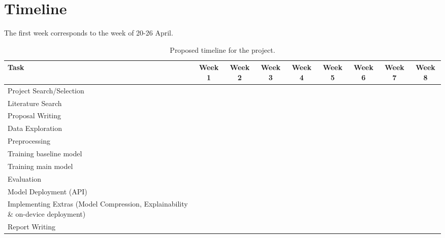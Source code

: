 \section{Timeline}

The first week corresponds to the week of 20-26 April.

\begin{table}[H]
\centering
\small
\setlength{\tabcolsep}{3pt}
\begin{tabular}{|p{2.5cm}|c|c|c|c|c|c|c|c|}
    \hline
    \textbf{Task} & \textbf{Week 1} & \textbf{Week 2} & \textbf{Week 3} & \textbf{Week 4} & \textbf{Week 5} & \textbf{Week 6} & \textbf{Week 7} & \textbf{Week 8} \\
    \hline
    Project Search/Selection & \cellcolor{black} &  &  &  &  &  &  &  \\
    \hline
    Literature Search & \cellcolor{black} & \cellcolor{black} &  &  &  &  &  &  \\
    \hline
    Proposal Writing & \cellcolor{black} & \cellcolor{black} &  &  &  &  &  &  \\
    \hline
    Data Exploration &  & \cellcolor{black} & \cellcolor{black} &  &  &  &  &  \\
    \hline
    Preprocessing &  &  & \cellcolor{black} & \cellcolor{black} &  &  &  &  \\
    \hline
    Training baseline model &  &  & \cellcolor{black} & \cellcolor{black} &  &  &  &  \\
    \hline
    Training main model &  &  &  & \cellcolor{black} & \cellcolor{black} &  &  &  \\
    \hline
    Evaluation &  &  &  &  &  \cellcolor{black} & \cellcolor{black} &  &  \\
    \hline
    Model Deployment (API) &  &  &  &  & \cellcolor{black} & \cellcolor{black} &  &  \\
    \hline
    Implementing Extras (Model Compression, Explainability \& on-device deployment) &  &  &  & \cellcolor{black} & \cellcolor{black} & \cellcolor{black} &  &  \\
    \hline
    Report Writing &  &  &  &  & \cellcolor{black} & \cellcolor{black} & \cellcolor{black} & \cellcolor{black} \\
    \hline
\end{tabular}
\caption{Proposed timeline for the project.}
\end{table}